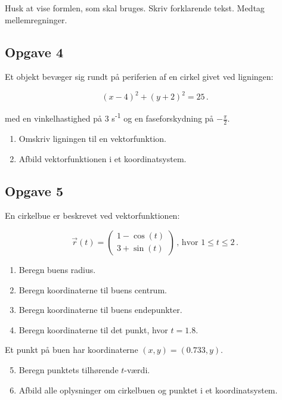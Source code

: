 \documentclass[a4paper, 12pt]{article}
\begin{document}
Husk at vise formlen, som skal bruges. Skriv forklarende tekst. Medtag mellemregninger.

\subsection*{Opgave 4}
\label{sec:org05b0d73}

Et objekt bevæger sig rundt på periferien af en cirkel givet ved ligningen:

$$(x-4)^2 + (y+2)^2 = 25\,.$$

med en vinkelhastighed på 3 s\textsuperscript{-1} og en faseforskydning på \(- \frac{\pi}{2}\).

\begin{enumerate}
\item Omskriv ligningen til en vektorfunktion.
\item Afbild vektorfunktionen i et koordinatsystem.
\end{enumerate}

\subsection*{Opgave 5}
\label{sec:org6a86260}

En cirkelbue er beskrevet ved vektorfunktionen:

$$\vec{r} (t) = \begin{pmatrix} 1 - \cos(t) \\ 3 + \sin(t) \end{pmatrix} \, , \, \text{hvor } 1 \leq t \leq 2 \,.$$

\begin{enumerate}
\item Beregn buens radius.
\item Beregn koordinaterne til buens centrum.
\item Beregn koordinaterne til buens endepunkter.
\item Beregn koordinaterne til det punkt, hvor \(t=1.8\).
\end{enumerate}

Et punkt på buen har koordinaterne \((x,y) = (0.733,y)\).

\begin{enumerate}
\setcounter{enumi}{4}
\item Beregn punktets tilhørende \(t\)​-værdi.
\item Afbild alle oplysninger om cirkelbuen og punktet i et koordinatsystem.
\end{enumerate}
\end{document}

